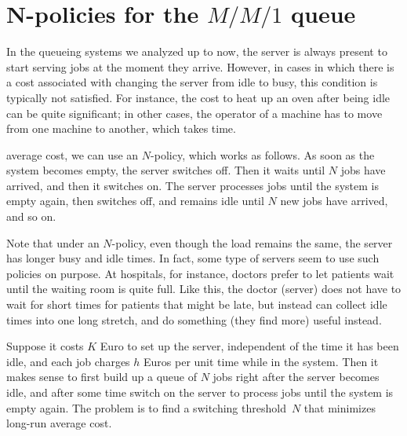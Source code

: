 


\section{N-policies for the $M/M/1$ queue}
\label{sec:n-policies}



In the queueing systems we analyzed up to now, the server is always present to start serving jobs at the moment they arrive.
However, in cases in which there is a cost associated with changing the server from idle to busy, this condition is typically not satisfied.
For instance, the cost to heat up an oven after being idle can be quite significant; in other cases, the operator of a machine has to move from one machine to another, which takes time.


 average cost, we can use an $N$-policy, which  works as follows.
As soon as the system becomes empty, the server switches off.
Then it waits until $N$ jobs have arrived, and then it switches on.
The server processes jobs until the system is empty again, then switches off, and remains idle until $N$ new jobs have arrived, and so on.

Note that under an $N$-policy, even though the load remains the same, the server has longer busy and idle times.
In fact, some type of servers seem to use such policies on purpose.
At hospitals, for instance, doctors prefer to let patients wait until the waiting room is quite full.
Like this, the doctor (server) does not have to wait for short times for patients that might be late, but instead can collect idle times into one long stretch, and do something (they find more) useful instead.

Suppose it costs $K$ Euro to set up the server, independent of the time it has been idle, and each job charges $h$ Euros per unit time while in the system.
Then it makes sense to first build up a queue of $N$ jobs right after the server becomes idle,
and after some time switch on the server to process jobs until the system is empty again.
The problem is to find a switching threshold~$N$ that minimizes long-run average cost.


